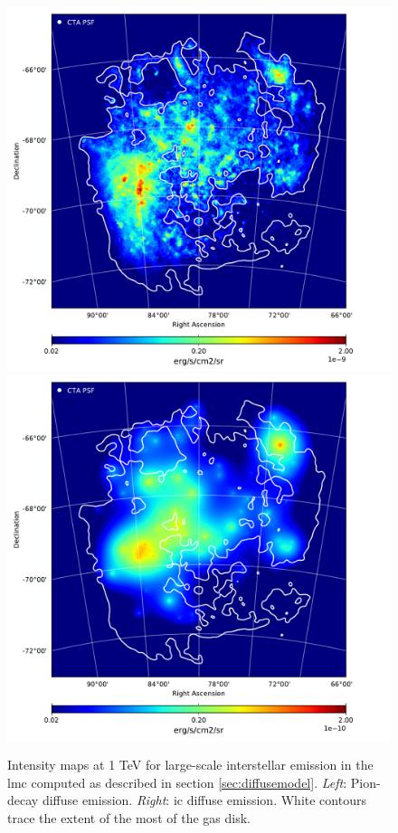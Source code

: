 \documentclass[main.tex]{subfiles}
\begin{document}
\begin{figure}[h]
\centering
{}
\includegraphics[width=1\textwidth]{Pictures/LMC-Pion_map-1TeV.pdf}
\endminipage 
{}
\includegraphics[width=1\textwidth]{Pictures/LMC-IC_map-1TeV.pdf}
\endminipage \\
  \caption{Intensity maps at 1 TeV for large-scale interstellar emission in the \gls{lmc} computed as described in section \ref{sec:diffusemodel}. \textit{Left}: Pion-decay diffuse emission. \textit{Right}: \gls{ic} diffuse emission. White contours trace the extent of the most of the gas disk.}
    \label{fig:mapmodels_cr}
\end{figure}
\end{document}
